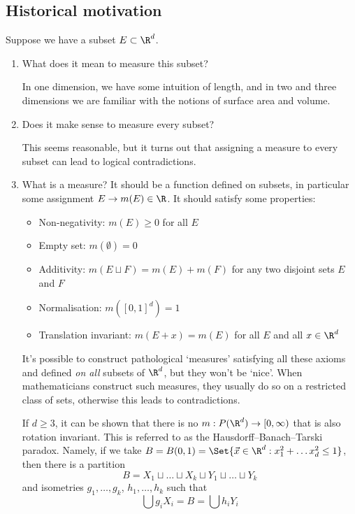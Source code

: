 \documentclass{article}
\newcommand{\1}[1]{\mathbbm{1}_{#1}}
\begin{document}
\subsection{Historical motivation}
Suppose we have a subset $E \subset \R^d$.
\begin{enumerate}
    \item What does it mean to measure this subset?

        In one dimension, we have some intuition of length, and in two and three dimensions we are familiar with the notions of surface area and volume.
    \item Does it make sense to measure every subset?

        This seems reasonable, but it turns out that assigning a measure to every subset can lead to logical contradictions.
    \item What is a measure? It should be a function defined on subsets, in particular some assignment $E \to m(E) \in \R$.
        It should satisfy some properties:
        \begin{itemize}
            \item Non-negativity: $m(E) \geq 0$ for all $E$
            \item Empty set: $m(\emptyset) = 0$
            \item Additivity: $m(E \sqcup F) = m(E) + m(F)$ for any two disjoint sets $E$ and $F$
            \item Normalisation: $m([0, 1]^d) = 1$
            \item Translation invariant: $m(E + x) = m(E)$ for all $E$ and all $x \in \R^d$
        \end{itemize}
        It's possible to construct pathological `measures' satisfying all these axioms and defined \emph{on all} subsets of $\R^d$, but they won't be `nice'.
        When mathematicians construct such measures, they usually do so on a restricted class of sets, otherwise this leads to contradictions.

        If $d \geq 3$, it can be shown that there is no $m: P(\R^d) \to [0, \infty)$ that is also rotation invariant.
        This is referred to as the Hausdorff--Banach--Tarski paradox.
        Namely, if we take $B = B(0, 1) = \Set{\vec{x} \in \R^d: x_1^2 + \dots x_d^2 \leq 1}$, then there is a partition
        \begin{equation*}
            B = X_1 \sqcup \dots \sqcup X_k \sqcup Y_1 \sqcup \dots \sqcup Y_k
        \end{equation*}
        and isometries $g_1, \dotsc, g_k$, $h_1, \dotsc, h_k$ such that
        \begin{equation*}
            \bigcup g_i X_i = B = \bigcup h_i Y_i
        \end{equation*}
\end{enumerate}
\end{document}

